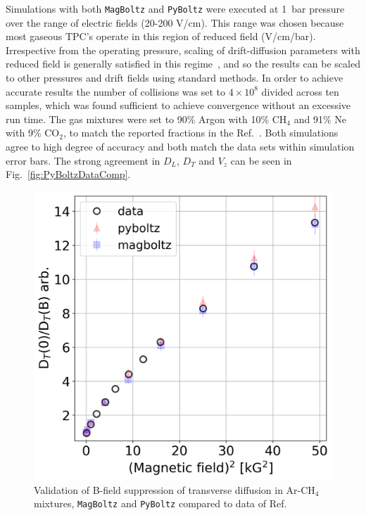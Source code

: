 \documentclass[3p,11pt]{elsarticle}
\begin{document}
Simulations with both {\tt MagBoltz} and  {\tt PyBoltz} were executed at 1~bar pressure over the range of electric fields (20-200 V/cm). This range was chosen because most gaseous TPC's operate in this region of reduced field (V/cm/bar).  Irrespective from the operating pressure, scaling of drift-diffusion parameters with reduced field is generally satisfied in this regime~\cite{Gonzalez-Diaz:2017gxo}, and so the results can be scaled to other pressures and drift fields using standard methods.  In order to achieve accurate results the number of collisions was set to $4\times10^{8}$ divided across ten samples, which was found sufficient to achieve convergence without an excessive run time. The gas mixtures were set to 90\% Argon with 10\% CH$_4$ and 91\% Ne with 9\% CO$_2$, to match the reported fractions in the Ref.~\cite{Brockmann:1994gz}. Both simulations agree to high degree of accuracy and both match the data sets within simulation error bars. The strong agreement in $D_L$, $D_T$ and $V_z$ can be seen in Fig.~\ref{fig:PyBoltzDataComp}.
 
 
\begin{figure}
\begin{centering}
\includegraphics[width=0.5\columnwidth]{Figures/PyBoltz_Bfield.png}
\par\end{centering}
\caption{Validation of B-field suppression of transverse diffusion in Ar-CH$_4$ mixtures, {\tt MagBoltz} and {\tt PyBoltz} compared to data of Ref.~\cite{amendolia1986dependence} 
\label{fig:PyBoltzBfield}}
\end{figure}
\end{document}
